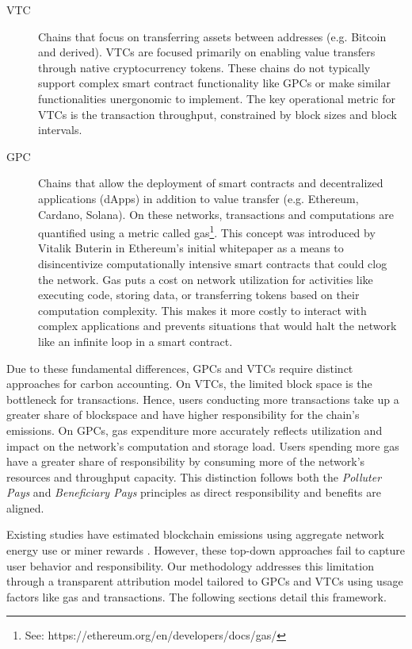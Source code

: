 \documentclass[11pt]{report}
\begin{document}
\begin{description}
    \item[\ac{VTC}] Chains that focus on transferring assets between addresses (e.g. Bitcoin and derived). VTCs are focused primarily on enabling value transfers through native cryptocurrency tokens. These chains do not typically support complex smart contract functionality like GPCs or make similar functionalities unergonomic to implement. The key operational metric for VTCs is the transaction throughput, constrained by block sizes and block intervals.

    \item[\ac{GPC}] Chains that allow the deployment of smart contracts and decentralized applications (dApps) in addition to value transfer (e.g. Ethereum, Cardano, Solana). On these networks, transactions and computations are quantified using a metric called gas\footnote{See: https://ethereum.org/en/developers/docs/gas/}. This concept was introduced by Vitalik Buterin in Ethereum's initial whitepaper \cite{buterinEthereumNextgenerationSmart} as a means to disincentivize computationally intensive smart contracts that could clog the network. Gas puts a cost on network utilization for activities like executing code, storing data, or transferring tokens based on their computation complexity. This makes it more costly to interact with complex applications and prevents situations that would halt the network like an infinite loop in a smart contract.
\end{description}

Due to these fundamental differences, GPCs and VTCs require distinct approaches for carbon accounting. On VTCs, the limited block space is the bottleneck for transactions. Hence, users conducting more transactions take up a greater share of blockspace and have higher responsibility for the chain's emissions. On GPCs, gas expenditure more accurately reflects utilization and impact on the network's computation and storage load. Users spending more gas have a greater share of responsibility by consuming more of the network's resources and throughput capacity. This distinction follows both the \textit{Polluter Pays} and \textit{Beneficiary Pays} principles as direct responsibility and benefits are aligned.

Existing studies have estimated blockchain emissions using aggregate network energy use or miner rewards \cite{devriesCryptocurrenciesRoadSustainability2022,devriesRevisitingBitcoinCarbon2022,neumuellerCambridgeBitcoinElectricity2021,mcdonaldEthereumEmissionsBottomup2022}. However, these top-down approaches fail to capture user behavior and responsibility. Our methodology addresses this limitation through a transparent attribution model tailored to GPCs and VTCs using usage factors like gas and transactions. The following sections detail this framework.
\end{document}
